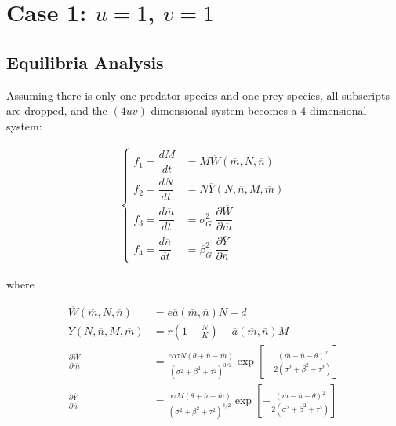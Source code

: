 \documentclass[12pt]{article}
\begin{document}
\vskip 30pt

									\section{Case 1: $u = 1$, $v = 1$}
									\subsection{Equilibria Analysis}


Assuming there is only one predator species and one prey species, all subscripts are dropped, and the $(4uv)$-dimensional system becomes a 4 dimensional system:

\begin{align}
	\begin{cases}
		f_1 = \dfrac{dM}{dt} &= M \overline{W}(\overline{m}, N, \overline{n}) \\[.25cm]
		f_2 = \dfrac{dN}{dt} &= N \overline{Y}(N, \overline{n}, M, \overline{m}) \\[.25cm]
		f_3 = \dfrac{d\overline{m}}{dt} &= \sigma_{G}^2 \; \dfrac{\partial \overline{W}}{\partial \overline{m}} \\[.25cm]
		f_4 = \dfrac{d\overline{n}}{dt} &= \beta_{G}^2 \; \dfrac{\partial \overline{Y}}{\partial \overline{n}}
	\end{cases}
\end{align}

\noindent where

\begin{align*}
	\overline{W}(\overline{m}, N, \overline{n}) &= e\overline{a}(\overline{m}, \overline{n})N - d \\
	\overline{Y}(N, \overline{n}, M, \overline{m}) &= r \left(1 - \frac{N}{K} \right) - \overline{a}(\overline{m}, \overline{n}) M \\
	\frac{\partial \overline{W}}{\partial \overline{m}} &= \frac{e\alpha\tau N(\theta + \overline{n} - \overline{m})}{(\sigma^2 + \beta^2 + \tau^2)^{3/2}} \exp\left[{-\frac{(\overline{m} - \overline{n} - \theta)^2}{2(\sigma^2 + \beta^2 + \tau^2)}}\right]\\
	\frac{\partial \overline{Y}}{\partial \overline{n}} &= \frac{\alpha\tau M(\theta + \overline{n} - \overline{m})}{(\sigma^2 + \beta^2 + \tau^2)^{3/2}} \exp\left[{-\frac{(\overline{m} - \overline{n} - \theta)^2}{2(\sigma^2 + \beta^2 + \tau^2)}}\right]
\end{align*}
\end{document}
